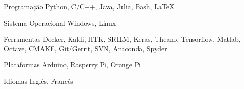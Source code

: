 

\begin{cvskills}

  \cvskill
    {Programação} %
    {Python, C/C++, Java, Julia, Bash, LaTeX} %

  \cvskill
    {Sistema Operacional} %
    {Windows, Linux} %

  \cvskill
    {Ferramentas} %
    {Docker, Kaldi, HTK, SRILM, Keras, Theano, Tensorflow, Matlab, Octave, CMAKE, Git/Gerrit, SVN, Anaconda, Spyder} %

  \cvskill
    {Plataformas} %
    {Arduino, Rasperry Pi, Orange Pi} %

  \cvskill
    {Idiomas} %
    {Inglês, Francês} %

\end{cvskills}
